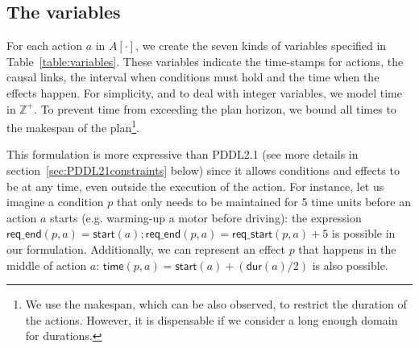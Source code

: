 \documentclass[runningheads]{llncs}
\newcommand{\dur}{\mathsf{dur}}    %
\newcommand{\start}{\mathsf{start}}%
\newcommand{\tim}{\mathsf{time}}   %
\newcommand{\reqs}{\mathsf{req\_{start}}} %
\newcommand{\reqe}{\mathsf{req\_{end}}}   %
\begin{document}
\subsection{The variables}
For each action $a$ in $A[\cdot]$, we create the seven kinds of variables specified in Table~\ref{table:variables}. These variables indicate the time-stamps for actions, the causal links, the interval when conditions must hold and the time when the effects happen. For simplicity, and to deal with integer variables, we model time in $\mathbb{Z}^+$. To prevent time from exceeding the plan horizon, we bound all times to the makespan of the plan\footnote{We use the makespan, which can be also observed, to restrict the duration of the actions. However, it is dispensable if we consider a long enough domain for durations.}.


This formulation is more expressive than PDDL2.1 (see more details in section~\ref{sec:PDDL21constraints} below) since it allows conditions and effects to be at any time, even outside the execution of the action. For instance, let us imagine a condition $p$ that only needs to be maintained for 5 time units before an action $a$ starts (e.g. warming-up a motor before driving): the expression $\reqe(p,a)=\start(a); \reqe(p,a) = \reqs(p,a)+5$ is possible in our formulation. Additionally, we can represent an effect $p$ that happens in the middle of action $a$: $\tim(p,a) = \start(a)+ (\dur(a) / 2)$ is also possible.
\end{document}
